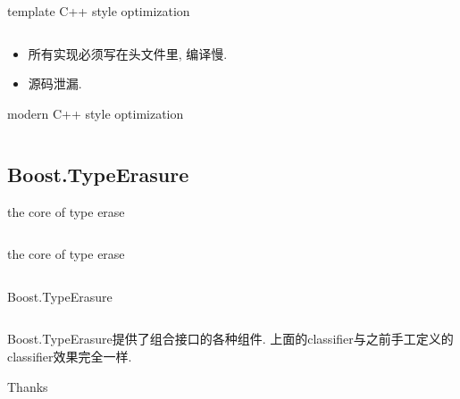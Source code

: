 \documentclass[compress]{beamer}
\begin{document}
\begin{frame}{template C++ style optimization}
    \inputminted[fontsize=\footnotesize]{c}{template_optimize.hpp}
    \vskip5mm
    \pause
    \begin{itemize}[<+->]
        \item 所有实现必须写在头文件里, 编译慢.
        \item 源码泄漏.
    \end{itemize}
\end{frame}

\begin{frame}{modern C++ style optimization}
    \inputminted[fontsize=\footnotesize]{c}{modern_optimize.hpp}
\end{frame}


\subsection{Boost.TypeErasure}

\begin{frame}{the core of type erase}
    \inputminted[fontsize=\footnotesize]{c}{core_te.hpp}
\end{frame}

\begin{frame}{the core of type erase}
    \inputminted[fontsize=\footnotesize]{c}{use_core_te.hpp}
\end{frame}

\begin{frame}{Boost.TypeErasure}
    \inputminted[fontsize=\footnotesize]{c}{boost_te.hpp}
    \vskip5mm
    Boost.TypeErasure提供了组合接口的各种组件. 上面的classifier与之前手工定义的classifier效果完全一样.
\end{frame}

\begin{frame}
    \begin{center}
        \huge{Thanks}
    \end{center}
\end{frame}
\end{document}
